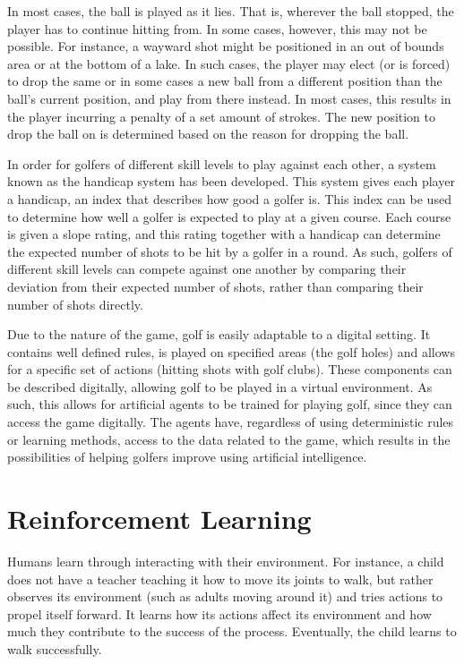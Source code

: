 \documentclass{kththesis}
\begin{document}
In most cases, the ball is played as it lies. That is, wherever the ball stopped, the player has to continue hitting from. In some cases, however, this may not be possible. For instance, a wayward shot might be positioned in an out of bounds area or at the bottom of a lake. In such cases, the player may elect (or is forced) to drop the same or in some cases a new ball from a different position than the ball's current position, and play from there instead. In most cases, this results in the player incurring a penalty of a set amount of strokes. The new position to drop the ball on is determined based on the reason for dropping the ball. 

In order for golfers of different skill levels to play against each other, a system known as the handicap system has been developed. This system gives each player a handicap, an index that describes how good a golfer is. This index can be used to determine how well a golfer is expected to play at a given course. Each course is given a slope rating, and this rating together with a handicap can determine the expected number of shots to be hit by a golfer in a round. As such, golfers of different skill levels can compete against one another by comparing their deviation from their expected number of shots, rather than comparing their number of shots directly.

Due to the nature of the game, golf is easily adaptable to a digital setting. It contains well defined rules, is played on specified areas (the golf holes) and allows for a specific set of actions (hitting shots with golf clubs). These components can be described digitally, allowing golf to be played in a virtual environment. As such, this allows for artificial agents to be trained for playing golf, since they can access the game digitally. The agents have, regardless of using deterministic rules or learning methods, access to the data related to the game, which results in the possibilities of helping golfers improve using artificial intelligence.

\section{Reinforcement Learning}
\label{sec:reinforcementlearning}
Humans learn through interacting with their environment. For instance, a child does not have a teacher teaching it how to move its joints to walk, but rather observes its environment (such as adults moving around it) and tries actions to propel itself forward. It learns how its actions affect its environment and how much they contribute to the success of the process. Eventually, the child learns to walk successfully. 
\end{document}
